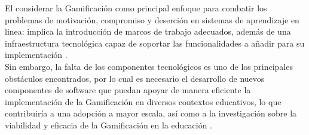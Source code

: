     
    
 \noindent El considerar la Gamificación como principal enfoque para combatir los problemas de motivación, compromiso y deserción en sistemas de aprendizaje en linea: implica la introducción de marcos de trabajo adecuados, además de una infraestructura tecnológica capaz de soportar las funcionalidades a añadir para su implementación \cite{mappingStudy}.\\
    
 \noindent Sin embargo, la falta de los componentes tecnológicos es uno de los principales obstáculos encontrados, por lo cual es necesario el desarrollo de nuevos componentes de software que puedan apoyar de manera eficiente la implementación de la Gamificación en diversos contextos educativos, lo que contribuiría a una adopción a mayor escala, así como a la investigación sobre la viabilidad y eficacia de la Gamificación en la educación \cite{mappingStudy}.\\
    
    
